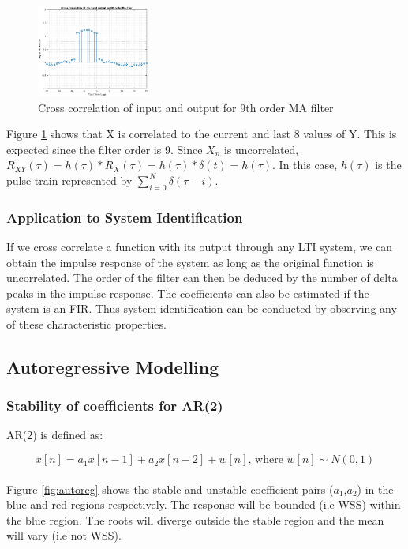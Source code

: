 \begin{figure}[h!]
\centering
\includegraphics[width=0.33\textwidth]{crosscorr}
\caption{\label{fig:crosscorr} Cross correlation of input and output for 9th order MA filter}
\end{figure}

Figure \ref{fig:crosscorr} shows that X is correlated to the current and last 8 values of Y. This is expected since the filter order is 9. Since $X_n$ is uncorrelated, $R_{XY}(\tau)=h(\tau) \ast R_X(\tau)=h(\tau) \ast \delta (t) = h(\tau)$. In this case, $h(\tau)$ is the pulse train represented by $\sum_{i=0}^N \delta(\tau - i)$.

\subsubsection{Application to System Identification}

If we cross correlate a function with its output through any LTI system, we can obtain the impulse response of the system as long as the original function is uncorrelated. The order of the filter can then be deduced by the number of delta peaks in the impulse response. The coefficients can also be estimated if the system is an FIR. Thus system identification can be conducted by observing any of these characteristic properties.

\pagebreak


\subsection{Autoregressive Modelling}

\subsubsection{Stability of coefficients for AR(2)}

AR(2) is defined as:

\begin{equation}
x[n] = a_1 x[n-1] + a_2 x[n-2] + w[n] \text{,   where } w[n] \sim N(0,1)
\end{equation}
\\
Figure \ref{fig:autoreg} shows the stable and unstable coefficient pairs ($a_1$,$a_2$) in the blue and red regions respectively. The response will be bounded (i.e WSS) within the blue region. The roots will diverge outside the stable region and the mean will vary (i.e not WSS).

